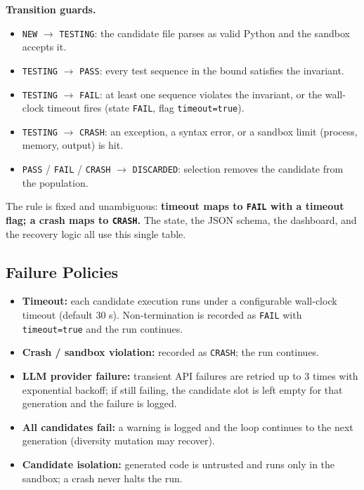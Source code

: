 \documentclass[12pt,a4paper]{article}
\begin{document}
\textbf{Transition guards.}

\begin{itemize}[noitemsep]
  \item \texttt{NEW} $\to$ \texttt{TESTING}: the candidate file parses as valid Python and the sandbox accepts it.
  \item \texttt{TESTING} $\to$ \texttt{PASS}: every test sequence in the bound satisfies the invariant.
  \item \texttt{TESTING} $\to$ \texttt{FAIL}: at least one sequence violates the invariant, or the wall-clock timeout fires (state \texttt{FAIL}, flag \texttt{timeout=true}).
  \item \texttt{TESTING} $\to$ \texttt{CRASH}: an exception, a syntax error, or a sandbox limit (process, memory, output) is hit.
  \item \texttt{PASS} / \texttt{FAIL} / \texttt{CRASH} $\to$ \texttt{DISCARDED}: selection removes the candidate from the population.
\end{itemize}

The rule is fixed and unambiguous: \textbf{timeout maps to \texttt{FAIL} with a timeout flag; a crash maps to \texttt{CRASH}.} The state, the JSON schema, the dashboard, and the recovery logic all use this single table.

\subsection{Failure Policies}

\begin{itemize}[noitemsep]
  \item \textbf{Timeout:} each candidate execution runs under a configurable wall-clock timeout (default 30 s). Non-termination is recorded as \texttt{FAIL} with \texttt{timeout=true} and the run continues.
  \item \textbf{Crash / sandbox violation:} recorded as \texttt{CRASH}; the run continues.
  \item \textbf{LLM provider failure:} transient API failures are retried up to 3 times with exponential backoff; if still failing, the candidate slot is left empty for that generation and the failure is logged.
  \item \textbf{All candidates fail:} a warning is logged and the loop continues to the next generation (diversity mutation may recover).
  \item \textbf{Candidate isolation:} generated code is untrusted and runs only in the sandbox; a crash never halts the run.
\end{itemize}
\end{document}
